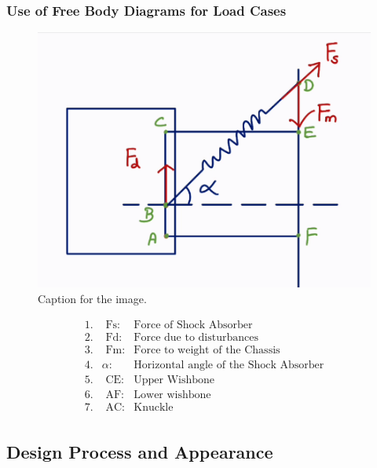 \subsubsection{Use of Free Body Diagrams for Load Cases}
\begin{figure}[ht!]
  \centering
  \includegraphics[width=\linewidth]{texfiles/mech/eimg/suspension/fbd.png}
  \caption{Caption for the image.}
  \label{fig:image1}
\end{figure}

\begin{align*}
1. & \text{ Fs:} & \text{Force of Shock Absorber} \\
2. & \text{ Fd:} & \text{Force due to disturbances} \\
3. & \text{ Fm:} & \text{Force to weight of the Chassis} \\
4. & \alpha: & \text{Horizontal angle of the Shock Absorber} \\
5. & \text{ CE:} & \text{Upper Wishbone} \\
6. & \text{ AF:} & \text{Lower wishbone} \\
7. & \text{ AC:} & \text{Knuckle} \\
\end{align*}

\subsection{Design Process and Appearance}
